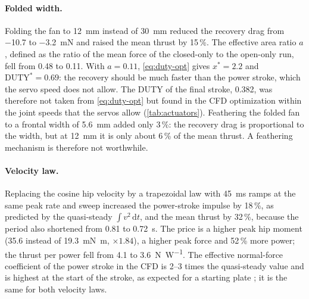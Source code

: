 \paragraph{Folded width.} Folding the fan to \SI{12}{\milli\metre} instead of \SI{30}{\milli\metre} reduced the
recovery drag from \SI{-10.7}{} to \SI{-3.2}{\milli\newton} and raised the mean thrust by 15\,\%. The effective
area ratio $a$, defined as the ratio of the mean force of the closed-only to the open-only run, fell from 0.48 to
0.11. With $a=0.11$, \eqref{eq:duty-opt} gives $x^*=2.2$ and $\mathrm{DUTY}^*=0.69$: the recovery should be much
faster than the power stroke, which the servo speed does not allow. The DUTY of the final stroke, 0.382, was therefore not taken from \eqref{eq:duty-opt} but found in the CFD optimization within the joint speeds that the servos allow (\cref{tab:actuators}). Feathering the folded fan to a frontal width of \SI{5.6}{\milli\metre} added only
3\,\%: the recovery drag is proportional to the width, but at \SI{12}{\milli\metre} it is only about 6\,\% of the
mean thrust. A feathering mechanism is therefore not worthwhile.

\paragraph{Velocity law.} Replacing the cosine hip velocity by a trapezoidal law with \SI{45}{\milli\second} ramps
at the same peak rate and sweep increased the power-stroke impulse by 18\,\%, as predicted by the quasi-steady
$\int v^2\,\mathrm dt$, and the mean thrust by 32\,\%, because the period also shortened from \SI{0.81}{} to
\SI{0.72}{\second}. The price is a higher peak hip moment (\SI{35.6}{} instead of \SI{19.3}{\milli\newton\metre},
$\times1.84$), a higher peak force and 52\,\% more power; the thrust per power fell from \SI{4.1}{} to
\SI{3.6}{\newton\per\watt}. The effective normal-force coefficient of the power stroke in the CFD is 2--3 times the
quasi-steady value and is highest at the start of the stroke, as expected for a starting plate \cite{Kim2011}; it
is the same for both velocity laws.

